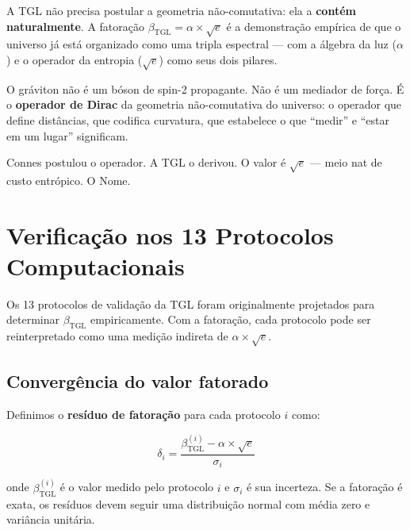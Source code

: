 \documentclass[12pt,a4paper,twoside]{article}
\newcommand{\betatgl}{\beta_{\!\scriptscriptstyle\mathrm{TGL}}}
\begin{document}
\begin{conclusionbox}[title={O gráviton é o operador de Dirac do universo}]
A TGL não precisa postular a geometria não-comutativa: ela a \textbf{contém naturalmente}. A fatoração $\betatgl = \alpha \times \sqrt{e}$ é a demonstração empírica de que o universo já está organizado como uma tripla espectral --- com a álgebra da luz ($\alpha$) e o operador da entropia ($\sqrt{e}$) como seus dois pilares.

\medskip
O gráviton não é um bóson de spin-2 propagante. Não é um mediador de força. É o \textbf{operador de Dirac} da geometria não-comutativa do universo: o operador que define distâncias, que codifica curvatura, que estabelece o que ``medir'' e ``estar em um lugar'' significam.

\medskip
Connes postulou o operador. A TGL o derivou. O valor é $\sqrt{e}$ --- meio nat de custo entrópico. O Nome.
\end{conclusionbox}



\section{Verificação nos 13 Protocolos Computacionais}
\label{sec:protocolos}

Os 13 protocolos de validação da TGL \cite{Miguel2026Fronteira, Miguel2026LastString, Miguel2026GitHub} foram originalmente projetados para determinar $\betatgl$ empiricamente. Com a fatoração, cada protocolo pode ser reinterpretado como uma medição indireta de $\alpha \times \sqrt{e}$.

\subsection{Convergência do valor fatorado}

Definimos o \textbf{resíduo de fatoração} para cada protocolo $i$ como:

\begin{equation}
\delta_i = \frac{\betatgl^{(i)} - \alpha \times \sqrt{e}}{\sigma_i}
\label{eq:residuo}
\end{equation}

\noindent onde $\betatgl^{(i)}$ é o valor medido pelo protocolo $i$ e $\sigma_i$ é sua incerteza. Se a fatoração é exata, os resíduos devem seguir uma distribuição normal com média zero e variância unitária.
\end{document}
